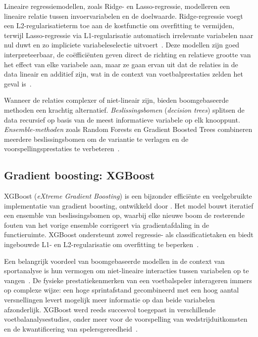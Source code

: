 Lineaire regressiemodellen, zoals Ridge- en Lasso-regressie, modelleren een lineaire relatie tussen invoervariabelen en de doelwaarde. Ridge-regressie voegt een L2-regularisatieterm toe aan de kostfunctie om overfitting te vermijden, terwijl Lasso-regressie via L1-regularisatie automatisch irrelevante variabelen naar nul duwt en zo impliciete variabeleselectie uitvoert~\autocite{geron-2023}. Deze modellen zijn goed interpreteerbaar, de coëfficiënten geven direct de richting en relatieve grootte van het effect van elke variabele aan, maar ze gaan ervan uit dat de relaties in de data lineair en additief zijn, wat in de context van voetbalprestaties zelden het geval is~\autocite{Almulla2020MachineLM}.
 
Wanneer de relaties complexer of niet-lineair zijn, bieden boomgebaseerde methoden een krachtig alternatief. \textit{Beslissingsbomen} (\textit{decision trees}) splitsen de data recursief op basis van de meest informatieve variabele op elk knooppunt. \textit{Ensemble-methoden} zoals Random Forests en Gradient Boosted Trees combineren meerdere beslissingsbomen om de variantie te verlagen en de voorspellingsprestaties te verbeteren~\autocite{BigData2024_SoccerOutcomePrediction,geron-2023}.
 
\subsection{Gradient boosting: XGBoost}
 
XGBoost (\textit{eXtreme Gradient Boosting}) is een bijzonder efficiënte en veelgebruikte implementatie van gradient boosting, ontwikkeld door \textcite{chen-2016}. Het model bouwt iteratief een ensemble van beslissingsbomen op, waarbij elke nieuwe boom de resterende fouten van het vorige ensemble corrigeert via gradientafdaling in de functieruimte. XGBoost ondersteunt zowel regressie- als classificatietaken en biedt ingebouwde L1- en L2-regularisatie om overfitting te beperken~\autocite{chen-2016}.
 
Een belangrijk voordeel van boomgebaseerde modellen in de context van sportanalyse is hun vermogen om niet-lineaire interacties tussen variabelen op te vangen~\autocite{Mandorino2023_PlayerReadiness}. De fysieke prestatiekenmerken van een voetbalspeler interageren immers op complexe wijze: een hoge sprintafstand gecombineerd met een hoog aantal versnellingen levert mogelijk meer informatie op dan beide variabelen afzonderlijk. XGBoost werd reeds succesvol toegepast in verschillende voetbalanalysestudies, onder meer voor de voorspelling van wedstrijduitkomsten~\autocite{BigData2024_SoccerOutcomePrediction} en de kwantificering van spelersgereedheid~\autocite{Mandorino2023_PlayerReadiness}.
 
